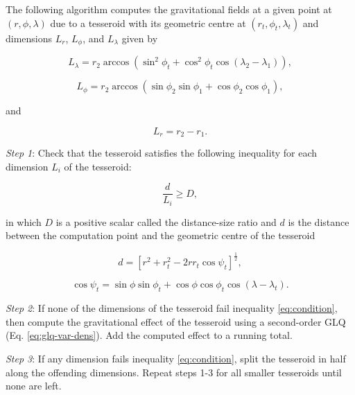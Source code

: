 \documentclass[extra, referee]{gji}
\begin{document}
The following algorithm computes the gravitational fields at a given point at $(r, \phi,
\lambda)$ due to a tesseroid with its geometric centre at $(r_t, \phi_t, \lambda_t)$ and
dimensions $L_r$, $L_\phi$, and $L_\lambda$ given by

\begin{equation}
    L_\lambda = r_2 \arccos(\sin^2\phi_t +
        \cos^2\phi_t\cos(\lambda_2 - \lambda_1)),
    \label{eq:sizelon}
\end{equation}

\begin{equation}
    L_\phi = r_2 \arccos(\sin\phi_2\sin\phi_1 + \cos\phi_2\cos\phi_1),
\end{equation}

and

\begin{equation}
    L_r = r_2 - r_1.
    \label{eq:sizer}
\end{equation}

\textit{Step 1}: Check that the tesseroid satisfies the following inequality for each
dimension $L_i$ of the tesseroid:

\begin{equation}
    \frac{d}{L_i} \geq D,
    \label{eq:condition}
\end{equation}

\noindent
in which $D$ is a positive scalar called the distance-size ratio and $d$ is the distance
between the computation point and the geometric centre of the tesseroid

\begin{equation}
    d = \left[
        r^2 + r_t^2 - 2 r r_t \cos\psi_t
        \right]^{\frac{1}{2}} ,
    \label{eq:distance}
\end{equation}

\begin{equation}
    \cos\psi_t =
        \sin\phi\sin\phi_t + \cos\phi\cos\phi_t\cos(\lambda - \lambda_t) .
\end{equation}

\textit{Step 2}:
If none of the dimensions of the tesseroid fail inequality
\ref{eq:condition}, then compute the gravitational effect of the tesseroid using a
second-order GLQ (Eq. \ref{eq:glq-var-dens}).
Add the computed effect to a running total.

\textit{Step 3}:
If any dimension fails inequality \ref{eq:condition}, split the tesseroid in half along
the offending dimensions.
Repeat steps 1-3 for all smaller tesseroids until none are left.
\end{document}
